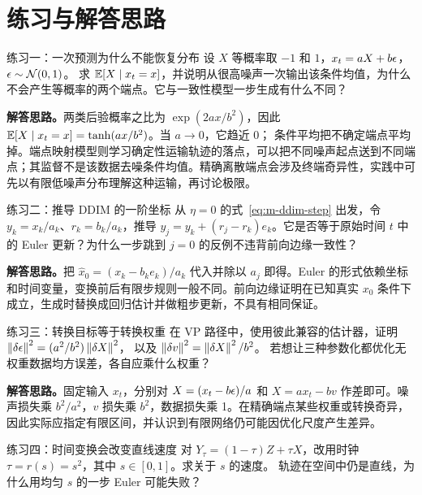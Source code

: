 \section{练习与解答思路}
\label{sec:m-exercises}

\begin{exercisebox}{练习一：一次预测为什么不能恢复分布}
设 $X$ 等概率取 $-1$ 和 $1$，$x_t=aX+b\epsilon$，$\epsilon\sim\mathcal{N}(0,1)$。
求 $\mathbb{E}[X\mid x_t=x]$，并说明从很高噪声一次输出该条件均值，为什么不会产生等概率的两个端点。它与一致性模型一步生成有什么不同？
\end{exercisebox}

\textbf{解答思路。}两类后验概率之比为
$\exp(2ax/b^2)$，因此
$\mathbb{E}[X\mid x_t=x]=\tanh(ax/b^2)$。当 $a\to0$，它趋近 0；
条件平均把不确定端点平均掉。端点映射模型则学习确定性运输轨迹的落点，可以把不同噪声起点送到不同端点；其监督不是该数据去噪条件均值。精确离散端点会涉及终端奇异性，实践中可先以有限低噪声分布理解这种运输，再讨论极限。

\begin{exercisebox}{练习二：推导 DDIM 的一阶坐标}
从 $\eta=0$ 的式~\eqref{eq:m-ddim-step} 出发，令
$y_k=x_k/a_k$、$r_k=b_k/a_k$，推导
$y_j=y_k+(r_j-r_k)e_k$。它是否等于原始时间 $t$ 中的 Euler 更新？为什么一步跳到 $j=0$ 的反例不违背前向边缘一致性？
\end{exercisebox}

\textbf{解答思路。}把 $\widehat x_0=(x_k-b_ke_k)/a_k$ 代入并除以
$a_j$ 即得。Euler 的形式依赖坐标和时间变量，变换前后有限步规则一般不同。前向边缘证明在已知真实 $x_0$ 条件下成立，生成时替换成回归估计并做粗步更新，不具有相同保证。

\begin{exercisebox}{练习三：转换目标等于转换权重}
在 VP 路径中，使用彼此兼容的估计器，证明
$\left\lVert\delta\epsilon\right\rVert^2=(a^2/b^2)\left\lVert\delta X\right\rVert^2$，
以及 $\left\lVert\delta v\right\rVert^2=\left\lVert\delta X\right\rVert^2/b^2$。
若想让三种参数化都优化无权重数据均方误差，各自应乘什么权重？
\end{exercisebox}

\textbf{解答思路。}固定输入 $x_t$，分别对
$X=(x_t-b\epsilon)/a$ 和 $X=ax_t-bv$ 作差即可。噪声损失乘
$b^2/a^2$，$v$ 损失乘 $b^2$，数据损失乘 1。在精确端点某些权重或转换奇异，因此实际应指定有限区间，并认识到有限网络仍可能因优化尺度产生差异。

\begin{exercisebox}{练习四：时间变换会改变直线速度}
对 $Y_\tau=(1-\tau)Z+\tau X$，改用时钟
$\tau=r(s)=s^2$，其中 $s\in[0,1]$。求关于 $s$ 的速度。
轨迹在空间中仍是直线，为什么用均匀 $s$ 的一步 Euler 可能失败？
\end{exercisebox}

